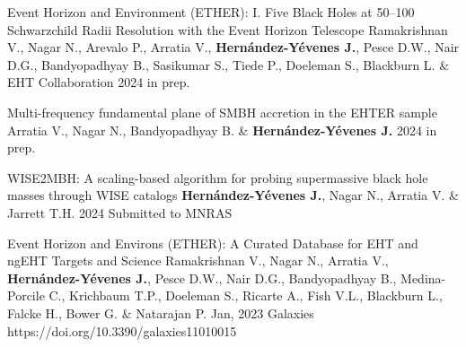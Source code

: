 
\begin{cvpublications}{}
\iffalse


	 \cvpublication{4}
	 {Comparing supermassive black hole mass estimates from WISE2MBH using AllWISE and WXSC with the literature}
	 {\textbf{Hernández-Yévenes J.}, Nagar N., Arratia V., Cluver M.E. \& Jarrett T.H.}
	 {2024}
     {in prep.}
     {}

\fi

	 {Event Horizon and Environment (ETHER): I. Five Black Holes at 50–100 Schwarzchild Radii Resolution with the Event Horizon Telescope}
	 {Ramakrishnan V., Nagar N., Arevalo P., Arratia V., \textbf{Hernández-Yévenes J.}, Pesce D.W., Nair D.G., Bandyopadhyay B., Sasikumar S.,  Tiede P., Doeleman S., Blackburn L. \& EHT Collaboration}
	 {2024}
     {in prep.}
     {}

	 {Multi-frequency fundamental plane of SMBH accretion in the EHTER sample}
	 {Arratia V., Nagar N., Bandyopadhyay B. \& \textbf{Hernández-Yévenes J.}}
	 {2024}
     {in prep.}
     {}
     
	 {WISE2MBH: A scaling-based algorithm for probing supermassive black hole masses through WISE catalogs}
	 {\textbf{Hernández-Yévenes J.}, Nagar N., Arratia V. \& Jarrett T.H.}
	 {2024}
     {Submitted to MNRAS}
     {}

	{Event Horizon and Environs (ETHER): A Curated Database for EHT and ngEHT Targets and Science}
	{Ramakrishnan V., Nagar N., Arratia V., \textbf{Hernández-Yévenes J.}, Pesce D.W., Nair D.G., Bandyopadhyay B., Medina-Porcile C.,  Krichbaum T.P., Doeleman S., Ricarte A., Fish V.L., Blackburn L., Falcke H., Bower G. \& Natarajan P.}
    {Jan, 2023}
	{Galaxies}
    {https://doi.org/10.3390/galaxies11010015}

\end{cvpublications}
